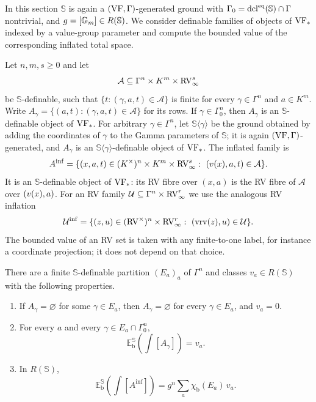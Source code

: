In this section $\mathbb S$ is again a $(\mathrm{VF},\Gamma)$-generated ground with
$\Gamma_0=\operatorname{dcl}^{\mathrm{eq}}(\mathbb S)\cap\Gamma$ nontrivial, and
$g=[\mathbb G_m]\in R(\mathbb S)$. We consider definable families of objects of
$\mathrm{VF}_*$ indexed by a value-group parameter and compute the bounded value of
the corresponding inflated total space.

Let $n,m,s\geq0$ and let
\[
 \mathcal A\subseteq\Gamma^n\times K^m\times\mathrm{RV}_\infty^s
\]
be $\mathbb S$-definable, such that $\{t:(\gamma,a,t)\in\mathcal A\}$ is
finite for every $\gamma\in\Gamma^n$ and $a\in K^m$. Write
$A_\gamma=\{(a,t):(\gamma,a,t)\in\mathcal A\}$ for its rows. If
$\gamma\in\Gamma_0^n$, then $A_\gamma$ is an $\mathbb S$-definable object of
$\mathrm{VF}_*$. For arbitrary $\gamma\in\Gamma^n$, let $\mathbb S\langle\gamma\rangle$
be the ground obtained by adding the coordinates of $\gamma$ to the Gamma
parameters of $\mathbb S$; it is again $(\mathrm{VF},\Gamma)$-generated, and
$A_\gamma$ is an $\mathbb S\langle\gamma\rangle$-definable object of
$\mathrm{VF}_*$. The inflated family is
\[
 A^{\mathrm{inf}}
   =\{(x,a,t)\in(K^\times)^n\times K^m\times\mathrm{RV}_\infty^s:\
       (v(x),a,t)\in\mathcal A\}.
\]
It is an $\mathbb S$-definable object of $\mathrm{VF}_*$: its RV fibre over $(x,a)$
is the RV fibre of $\mathcal A$ over $(v(x),a)$. For an RV family
$\mathcal U\subseteq\Gamma^n\times\mathrm{RV}_\infty^r$ we use the analogous RV
inflation
\[
 \mathcal U^{\mathrm{inf}}
   =\{(z,u)\in(\mathrm{RV}^\times)^n\times\mathrm{RV}_\infty^r:\ (\operatorname{vrv}(z),u)\in\mathcal U\}.
\]
The bounded value of an RV set is taken with any finite-to-one label, for
instance a coordinate projection; it does not depend on that choice.

\begin{thm}\label{thm:inflated}
There are a finite $\mathbb S$-definable partition $(E_a)_{a}$ of $\Gamma^n$
and classes $v_a\in R(\mathbb S)$ with the following properties.
\begin{enumerate}
\item If $A_\gamma=\varnothing$ for some $\gamma\in E_a$, then
$A_\gamma=\varnothing$ for every $\gamma\in E_a$, and $v_a=0$.
\item For every $a$ and every $\gamma\in E_a\cap\Gamma_0^n$,
\[
 \mathbb E_{\mathrm b}^{\mathbb S}\!\left(\int[A_\gamma]\right)=v_a .
\]
\item In $R(\mathbb S)$,
\begin{equation}\label{inflated:fubini}
 \mathbb E_{\mathrm b}^{\mathbb S}\!\left(\int[A^{\mathrm{inf}}]\right)
   =g^n\sum_a\chi_{\mathrm b}(E_a)\,v_a .
\end{equation}
\end{enumerate}
\end{thm}


